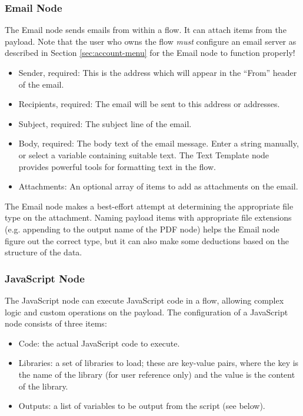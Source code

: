 \subsubsection{Email Node}
The Email node sends emails from within a flow. It can attach items from the payload. Note that the user who owns the flow \emph{must} configure an email server as described in Section \ref{sec:account-menu} for the Email node to function properly!

\begin{itemize}
\item Sender, required: This is the address which will appear in the ``From'' header of the email.
\item Recipients, required: The email will be sent to this address or addresses.
\item Subject, required: The subject line of the email.
\item Body, required: The body text of the email message. Enter a string manually, or select a variable containing suitable text. The Text Template node provides powerful tools for formatting text in the flow.
\item Attachments: An optional array of items to add as attachments on the email.
\end{itemize}

The Email node makes a best-effort attempt at determining the appropriate file type on the attachment. Naming payload items with appropriate file extensions (e.g. appending  to the output name of the PDF node) helps the Email node figure out the correct type, but it can also make some deductions based on the structure of the data.

\subsubsection{JavaScript Node}
The JavaScript node can execute JavaScript code in a flow, allowing complex logic and custom operations on the payload. The configuration of a JavaScript node consists of three items:

\begin{itemize}
\item Code: the actual JavaScript code to execute.
\item Libraries: a set of libraries to load; these are key-value pairs, where the key is the name of the library (for user reference only) and the value is the content of the library.
\item Outputs: a list of variables to be output from the script (see below).
\end{itemize}

